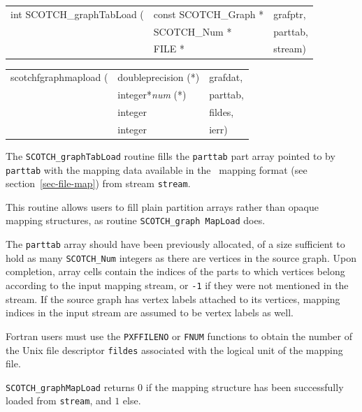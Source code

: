 \begin{itemize}
\progsyn

{\tt\begin{tabular}{l@{}ll}
int SCOTCH\_graphTabLoad ( & const SCOTCH\_Graph * & grafptr, \\
                           & SCOTCH\_Num *         & parttab, \\
                           & FILE *                & stream)
\end{tabular}}

{\tt\begin{tabular}{l@{}ll}
scotchfgraphmapload ( & doubleprecision (*)   & grafdat, \\
                      & integer*{\it num} (*) & parttab, \\
                      & integer               & fildes, \\
                      & integer               & ierr)
\end{tabular}}

\progdes

The {\tt SCOTCH\_graphTabLoad} routine fills the
{\tt parttab} part array pointed to by {\tt parttab} with the mapping
data available in the \scotch\ mapping format (see section~\ref{sec-file-map})
from stream {\tt stream}.

This routine allows users to fill plain partition arrays rather than
opaque mapping structures, as routine {\tt SCOTCH\_\lbt graph\lbt
Map\lbt Load} does.

The {\tt parttab} array should have been previously allocated, of a
size sufficient to hold as many {\tt SCOTCH\_\lbt Num} integers as
there are vertices in the source graph. Upon completion, array cells
contain the indices of the parts to which vertices belong according to
the input mapping stream, or {\tt -1} if they were not mentioned in
the stream. If the source graph has vertex labels attached to its
vertices, mapping indices in the input stream are assumed to be vertex
labels as well.

Fortran users must use the {\tt PXFFILENO} or {\tt FNUM} functions to
obtain the number of the Unix file descriptor {\tt fildes} associated
with the logical unit of the mapping file.

\progret

{\tt SCOTCH\_graphMapLoad} returns $0$ if the mapping structure
has been successfully loaded from {\tt stream}, and $1$ else.
\end{itemize}

